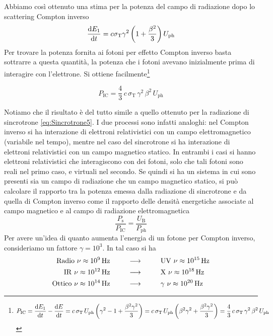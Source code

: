 Abbiamo così ottenuto una stima per la potenza del campo di radiazione dopo lo scattering Compton inverso
\begin{equation}
\dfrac{\mathrm{d} {E_1}}{\mathrm{d} {t}}  =c \sigma_\mathrm{T}\gamma^2\left( 1+\dfrac{\beta^2}{3} \right) U_\mathrm{ph}
\end{equation}
Per trovare la potenza fornita ai fotoni per effetto Compton inverso basta sottrarre a questa quantità, la potenza che i fotoni avevano inizialmente prima di interagire con l'elettrone. Si ottiene facilmente\footnote{
\begin{align*}
P_\mathrm{IC} = \dfrac{\mathrm{d} {E_1}}{\mathrm{d} {t}} - \dfrac{\mathrm{d} {E}}{\mathrm{d} {t}}  = c\,\sigma_\mathrm{T} \, U_\mathrm{ph} \left( \gamma^2-1+\dfrac{\beta^2\gamma^2}{3} \right) = c\,\sigma_\mathrm{T} \, U_\mathrm{ph} \left( \beta^2\gamma^2+\dfrac{\beta^2\gamma^2}{3} \right) = \dfrac{4}{3} \, c\,\sigma_\mathrm{T}\,\gamma^2\,\beta^2\,U_\mathrm{ph}
\end{align*}}
\begin{EQ}
\begin{equation}
P_\mathrm{IC} = \dfrac{4}{3} \, c\,\sigma_\mathrm{T}\,\gamma^2\,\beta^2\,U_\mathrm{ph}
\end{equation}
\end{EQ}
Notiamo che il risultato è del tutto simile a quello ottenuto per la radiazione di sincrotrone \ref{eq:Sincrotrone5}. I due processi sono infatti analoghi: nel Compton inverso si ha interazione di elettroni relativistici con un campo elettromagnetico (variabile nel tempo), mentre nel caso del sincrotrone si ha interazione di elettroni relativistici con un campo magnetico statico. In entrambi i casi si hanno elettroni relativistici che interagiscono con dei fotoni, solo che tali fotoni sono reali nel primo caso, e virtuali nel secondo. Se quindi si ha un sistema in cui sono presenti sia un campo di radiazione che un campo magnetico statico, si può calcolare il rapporto tra la potenza emessa dalla radiazione di sincrotrone e da quella di Compton inverso come il rapporto delle densità energetiche associate al campo magnetico e al campo di radiazione elettromagnetica
\begin{equation}
\dfrac{P_\mathrm{s}}{P_\mathrm{IC}} = \dfrac{U_\mathrm{B}}{P_\mathrm{ph}} 
\end{equation}
Per avere un'idea di quanto aumenta l'energia di un fotone per Compton inverso, consideriamo un fattore $\gamma=10^3$. In tal caso si ha
\begin{align*}
\mathrm{Radio}\,\,\nu\approx 10^{9} \,\mathrm{ Hz} \,\,\,\,\,\,\,\,\,\,\,\,\,\,\,&\longrightarrow\,\,\,\,\,\,\,\,\,\,\,\,\,\,\, \mathrm{UV} \,\,\nu\approx 10^{15} \,\mathrm{ Hz} \\
\mathrm{IR}\,\,\nu\approx 10^{12} \,\mathrm{ Hz} \,\,\,\,\,\,\,\,\,\,\,\,\,\,\,&\longrightarrow\,\,\,\,\,\,\,\,\,\,\,\,\,\,\, \mathrm{X} \,\,\nu\approx 10^{18} \,\mathrm{ Hz} \\
\mathrm{Ottico}\,\,\nu\approx 10^{14} \,\mathrm{ Hz} \,\,\,\,\,\,\,\,\,\,\,\,\,\,\,&\longrightarrow\,\,\,\,\,\,\,\,\,\,\,\,\,\,\, \gamma \,\,\nu\approx 10^{20} \,\mathrm{ Hz} 
\end{align*}

